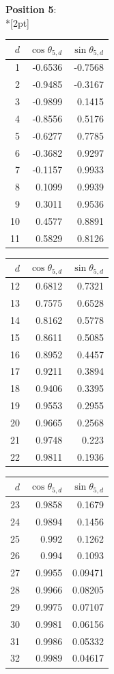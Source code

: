 \noindent \textbf{Position 5}:\\*[2pt]
{\tablefont \begin{tabular}[t]{r|rr}
$d$ & $\cos\theta_{5,d}$ & $\sin\theta_{5,d}$ \\\hline
1 & -0.6536 & -0.7568 \\
2 & -0.9485 & -0.3167 \\
3 & -0.9899 & 0.1415 \\
4 & -0.8556 & 0.5176 \\
5 & -0.6277 & 0.7785 \\
6 & -0.3682 & 0.9297 \\
7 & -0.1157 & 0.9933 \\
8 & 0.1099 & 0.9939 \\
9 & 0.3011 & 0.9536 \\
10 & 0.4577 & 0.8891 \\
11 & 0.5829 & 0.8126
\end{tabular}\kern4pt
\begin{tabular}[t]{r|rr}
$d$ & $\cos\theta_{5,d}$ & $\sin\theta_{5,d}$ \\\hline
12 & 0.6812 & 0.7321 \\
13 & 0.7575 & 0.6528 \\
14 & 0.8162 & 0.5778 \\
15 & 0.8611 & 0.5085 \\
16 & 0.8952 & 0.4457 \\
17 & 0.9211 & 0.3894 \\
18 & 0.9406 & 0.3395 \\
19 & 0.9553 & 0.2955 \\
20 & 0.9665 & 0.2568 \\
21 & 0.9748 & 0.223 \\
22 & 0.9811 & 0.1936
\end{tabular}\kern4pt
\begin{tabular}[t]{r|rr}
$d$ & $\cos\theta_{5,d}$ & $\sin\theta_{5,d}$ \\\hline
23 & 0.9858 & 0.1679 \\
24 & 0.9894 & 0.1456 \\
25 & 0.992 & 0.1262 \\
26 & 0.994 & 0.1093 \\
27 & 0.9955 & 0.09471 \\
28 & 0.9966 & 0.08205 \\
29 & 0.9975 & 0.07107 \\
30 & 0.9981 & 0.06156 \\
31 & 0.9986 & 0.05332 \\
32 & 0.9989 & 0.04617 \\

\end{tabular}}
